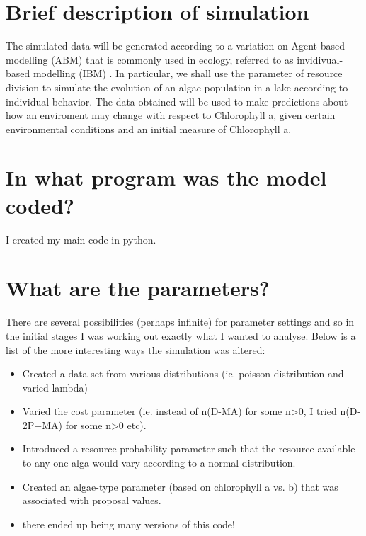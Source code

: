 \documentclass[]{article}
\begin{document}
\section{Brief description of
simulation}\label{brief-description-of-simulation}

The simulated data will be generated according to a variation on
Agent-based modelling (ABM) that is commonly used in ecology, referred
to as invidivual-based modelling (IBM) . In particular, we shall use the
parameter of resource division to simulate the evolution of an algae
population in a lake according to individual behavior. The data obtained
will be used to make predictions about how an enviroment may change with
respect to Chlorophyll a, given certain environmental conditions and an
initial measure of Chlorophyll a.

\section{In what program was the model
coded?}\label{in-what-program-was-the-model-coded}

I created my main code in python.

\section{What are the parameters?}\label{what-are-the-parameters}

There are several possibilities (perhaps infinite) for parameter
settings and so in the initial stages I was working out exactly what I
wanted to analyse. Below is a list of the more interesting ways the
simulation was altered:

\begin{itemize}
    \item Created a data set from various distributions (ie. poisson distribution and varied lambda)
    \item Varied the cost parameter (ie. instead of n(D-MA) for some n>0, I tried n(D-2P+MA) for some n>0 etc).
    \item Introduced a resource probability parameter such that the resource available to any one alga would vary according to a normal distribution.
    \item Created an algae-type parameter (based on chlorophyll a vs. b) that was associated with proposal values.  
    \item there ended up being many versions of this code! 
\end{itemize}
\end{document}
